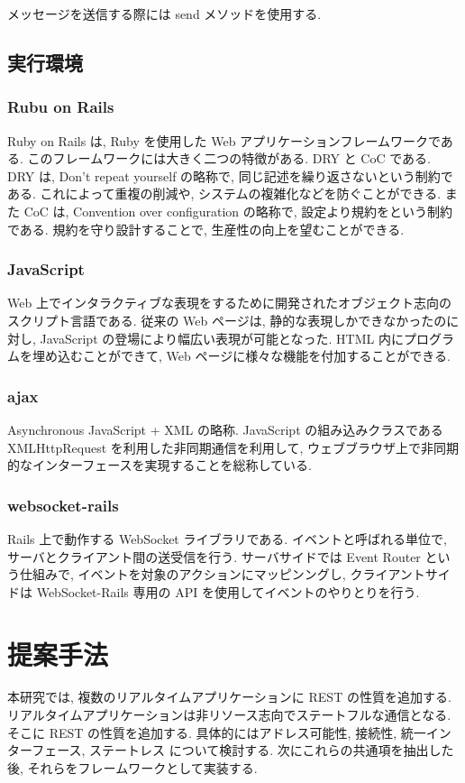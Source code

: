 \documentclass[a4j, 10pt, twocolumn]{ujarticle}
\begin{document}
    メッセージを送信する際には send メソッドを使用する.

    \subsection{実行環境} 

    \subsubsection{Rubu on Rails}
    Ruby on Rails は, Ruby を使用した Web アプリケーションフレームワークである. このフレームワークには大きく二つの特徴がある. DRY と CoC である. DRY は, Don't repeat yourself の略称で, 同じ記述を繰り返さないという制約である. これによって重複の削減や, システムの複雑化などを防ぐことができる. また CoC は, Convention over configuration の略称で, 設定より規約をという制約である. 規約を守り設計することで, 生産性の向上を望むことができる. 

    \subsubsection{JavaScript}
    Web 上でインタラクティブな表現をするために開発されたオブジェクト志向のスクリプト言語である. 従来の Web ページは, 静的な表現しかできなかったのに対し, JavaScript の登場により幅広い表現が可能となった. HTML 内にプログラムを埋め込むことができて, Web ページに様々な機能を付加することができる. 

    \subsubsection{ajax}
    Asynchronous JavaScript + XML の略称. JavaScript の組み込みクラスである XMLHttpRequest を利用した非同期通信を利用して, ウェブブラウザ上で非同期的なインターフェースを実現することを総称している. 
    

    \subsubsection{websocket-rails}
    Rails 上で動作する WebSocket ライブラリである. イベントと呼ばれる単位で, サーバとクライアント間の送受信を行う. サーバサイドでは Event Router という仕組みで, イベントを対象のアクションにマッピンングし, クライアントサイドは WebSocket-Rails 専用の API を使用してイベントのやりとりを行う. 

    \section{提案手法}
    本研究では, 複数のリアルタイムアプリケーションに REST の性質を追加する. リアルタイムアプリケーションは非リソース志向でステートフルな通信となる.\cite{statefull_book} そこに REST の性質を追加する. 具体的にはアドレス可能性, 接続性, 統一インターフェース, ステートレス について検討する. 次にこれらの共通項を抽出した後, それらをフレームワークとして実装する.
\end{document}
